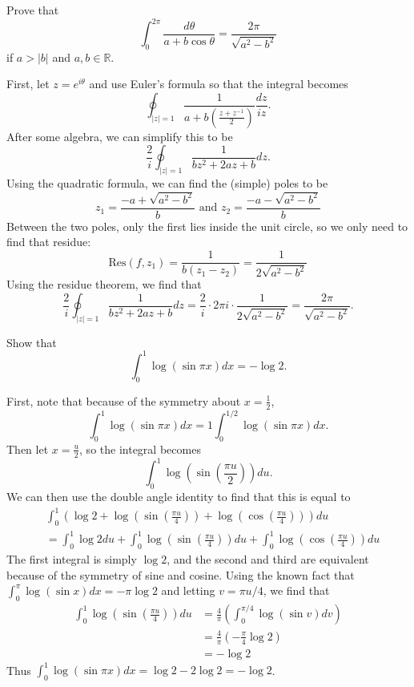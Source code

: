 \documentclass[12pt]{article}
\begin{document}

\begin{statement}[8]
  Prove that 
  $$ \int^{2\pi}_{0} \frac{d \theta}{a+b \cos \theta} = \frac{2 \pi}{\sqrt{a^2 - b^2}} $$
  if $a > \vert b \vert$ and $a,b \in \mathbb{R}$. 
\end{statement}
\begin{newproof}
    First, let $z = e^{i \theta}$ and use Euler's formula so that the integral becomes 
    $$ \oint_{\vert z \vert = 1} \frac{1}{a+b(\frac{z+z^{-1}}{2})} \frac{dz}{iz}. $$
    After some algebra, we can simplify this to be 
    $$ \frac{2}{i} \oint_{\vert z \vert=1} \frac{1}{bz^2+2az+b} dz. $$
    Using the quadratic formula, we can find the (simple) poles to be 
    $$ z_1 = \frac{-a+\sqrt{a^2 - b^2}}{b} \text{ and } z_2= \frac{-a - \sqrt{a^2 - b^2}}{b}$$
    Between the two poles, only the first lies inside the unit circle, so we only need to find that residue:
    $$ \text{Res}(f,z_1)=\frac{1}{b(z_1 - z_2)} = \frac{1}{2\sqrt{a^2 - b^2}}$$
    Using the residue theorem, we find that 
    $$ \frac{2}{i} \oint_{\vert z \vert=1} \frac{1}{bz^2+2az+b} dz = \frac{2}{i} \cdot 2\pi i \cdot \frac{1}{2\sqrt{a^2 - b^2}} = \frac{2\pi}{\sqrt{a^2 - b^2}}.$$
\end{newproof}


\begin{statement}[9]
  Show that 
  $$ \int^1_0 \log(\sin \pi x) dx = - \log 2. $$
\end{statement}
\begin{newproof}
    First, note that because of the symmetry about $x=\frac{1}{2}$, 
    $$ \int^1_0 \log(\sin \pi x)dx = 1 \int^{1/2}_{0} \log (\sin \pi x)dx. $$
    Then let $x = \frac{u}{2}$, so the integral becomes 
    $$ \int^1_0 \log(\sin(\frac{\pi u}{2}))du. $$
    We can then use the double angle identity to find that this is equal to 
    \begin{align*}
        & \int^1_0 \left(\log 2 + \log\left(\sin\left(\frac{\pi u}{4}\right)\right) + \log\left(\cos\left(\frac{\pi u}{4}\right)\right)\right) du \\
        &= \int^1_0 \log 2 du + \int^1_0 \log\left(\sin\left(\frac{\pi u}{4}\right)\right) du  + \int^1_0 \log\left(\cos\left(\frac{\pi u}{4}\right)\right) du
    \end{align*}
    The first integral is simply $\log 2$, and the second and third are equivalent because of the symmetry of sine and cosine. 
    Using the known fact that $\int^{\pi}_0 \log(\sin x)dx = - \pi \log 2$ and letting $v = \pi u / 4$, we find that 
    \begin{align*}
        \int^1_0 \log\left(\sin\left(\frac{\pi u}{4}\right)\right) du &= \frac{4}{\pi} \left( \int^{\pi/4}_0 \log (\sin v) dv \right) \\
        &= \frac{4}{\pi} \left( - \frac{\pi}{4} \log 2 \right) \\
        &= - \log 2
    \end{align*}
    Thus $\int^1_0 \log(\sin \pi x) dx = \log 2 - 2 \log 2 = - \log 2$. 
\end{newproof}
\end{document}
